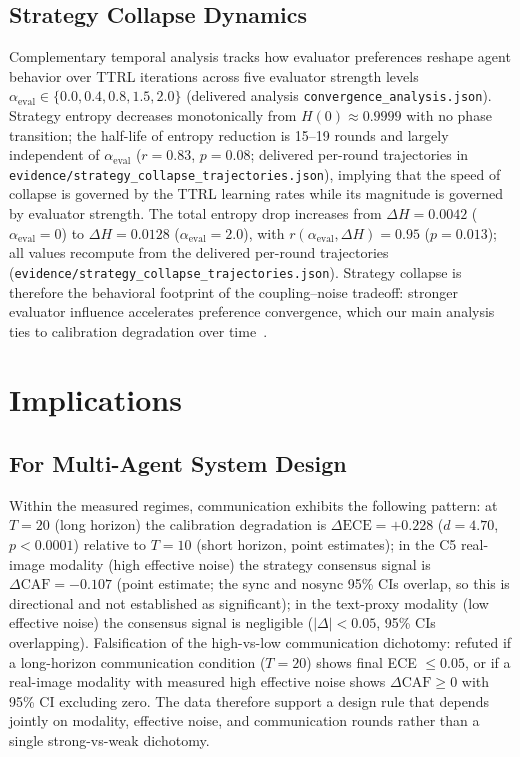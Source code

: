 \documentclass[11pt]{article}
\begin{document}
\subsection{Strategy Collapse Dynamics}
Complementary temporal analysis tracks how evaluator preferences reshape agent behavior over TTRL iterations across five evaluator strength levels $\alpha_{\text{eval}} \in \{0.0, 0.4, 0.8, 1.5, 2.0\}$ (delivered analysis \texttt{convergence\_analysis.json}). Strategy entropy decreases monotonically from $H(0) \approx 0.9999$ with no phase transition; the half-life of entropy reduction is 15--19 rounds and largely independent of $\alpha_{\text{eval}}$ ($r = 0.83$, $p = 0.08$; delivered per-round trajectories in \texttt{evidence/strategy\_collapse\_trajectories.json}), implying that the speed of collapse is governed by the TTRL learning rates while its magnitude is governed by evaluator strength. The total entropy drop increases from $\Delta H = 0.0042$ ($\alpha_{\text{eval}}{=}0$) to $\Delta H = 0.0128$ ($\alpha_{\text{eval}}{=}2.0$), with $r(\alpha_{\text{eval}}, \Delta H) = 0.95$ ($p = 0.013$); all values recompute from the delivered per-round trajectories (\texttt{evidence/strategy\_collapse\_trajectories.json}). Strategy collapse is therefore the behavioral footprint of the coupling--noise tradeoff: stronger evaluator influence accelerates preference convergence, which our main analysis ties to calibration degradation over time~\citep{strategycollapse2026}.
\section{Implications}

\subsection{For Multi-Agent System Design}

Within the measured regimes, communication exhibits the following pattern: at $T = 20$ (long horizon) the calibration degradation is $\Delta\text{ECE} = +0.228$ ($d = 4.70$, $p < 0.0001$) relative to $T = 10$ (short horizon, point estimates); in the C5 real-image modality (high effective noise) the strategy consensus signal is $\Delta\text{CAF} = -0.107$ (point estimate; the sync and nosync 95\% CIs overlap, so this is directional and not established as significant); in the text-proxy modality (low effective noise) the consensus signal is negligible ($|\Delta| < 0.05$, 95\% CIs overlapping). Falsification of the high-vs-low communication dichotomy: refuted if a long-horizon communication condition ($T = 20$) shows final ECE $\leq 0.05$, or if a real-image modality with measured high effective noise shows $\Delta\text{CAF} \geq 0$ with 95\% CI excluding zero. The data therefore support a design rule that depends jointly on modality, effective noise, and communication rounds rather than a single strong-vs-weak dichotomy.
\end{document}

